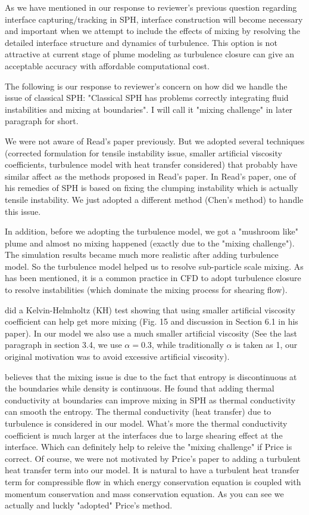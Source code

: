 \documentclass[10pt,a4paper]{article}
\begin{document}
As we have mentioned in our response to reviewer's previous question regarding interface capturing/tracking in SPH, interface construction will become necessary and important when we attempt to include the effects of mixing by resolving the detailed interface structure and dynamics of turbulence. This option is not attractive at current stage of plume modeling as turbulence closure can give an acceptable accuracy with affordable computational cost.

The following is our response to reviewer's concern on how did we handle the issue of classical SPH: "Classical SPH has problems correctly integrating fluid instabilities and mixing at boundaries". I will call it "mixing challenge" in later paragraph for short.

We were not aware of Read's paper previously. But we adopted several techniques (corrected formulation for tensile instability issue, smaller artificial viscosity coefficients, turbulence model with heat transfer considered) that probably have similar affect as the methods proposed in Read's paper. In Read's paper, one of his remedies of SPH is based on fixing the clumping instability which is actually tensile instability. We just adopted a different method (Chen's method) to handle this issue.

In addition, before we adopting the turbulence model, we got a "mushroom like" plume and almost no mixing happened (exactly due to the "mixing challenge"). The simulation results became much more realistic after adding turbulence model. So the turbulence model helped us to resolve sub-particle scale mixing. As has been mentioned, it is a common practice in CFD to adopt turbulence closure to resolve instabilities (which dominate the mixing process for shearing flow).

\citet{agertz2007fundamental} did a Kelvin-Helmholtz (KH) test showing that using smaller artificial viscosity coefficient can help get more mixing (Fig. 15 and discussion in Section 6.1 in his paper). In our model we also use a much smaller artificial viscosity (See the last paragraph in section 3.4, we use $\alpha =0.3$, while traditionally $\alpha$ is taken as 1, our original motivation was to avoid excessive artificial viscosity).

\citet{price2008modelling} believes that the mixing issue is due to the fact that entropy is discontinuous at the boundaries while density is continuous. He found that adding thermal conductivity at boundaries can improve mixing in SPH as thermal conductivity can smooth the entropy. The thermal conductivity (heat transfer) due to turbulence is considered in our model. What's more the thermal conductivity coefficient is much larger at the interfaces due to large shearing effect at the interface. Which can definitely help to releive the "mixing challenge" if Price is correct. Of course, we were not motivated by Price's paper to adding a turbulent heat transfer term into our model. It is natural to have a turbulent heat transfer term for compressible flow in which energy conservation equation is coupled with momentum conservation and mass conservation equation. As you can see we actually and luckly "adopted" Price's method.
\end{document}
